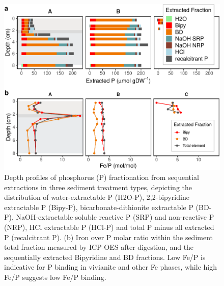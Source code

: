 \documentclass[12pt,twoside]{book}
\begin{document}
\begin{figure}
\centering
\includegraphics{my-thesis_files/figure-latex/IncubationSeq-1.pdf}
\caption{\label{fig:IncubationSeq}Depth profiles of phosphorus (P) fractionation from sequential extractions in three sediment treatment types, depicting the distribution of water-extractable P (H2O-P), 2,2-bipyridine extractable P (Bipy-P), bicarbonate-dithionite extractable P (BD-P), NaOH-extractable soluble reactive P (SRP) and non-reactive P (NRP), HCl extractable P (HCl-P) and total P minus all extracted P (recalcitrant P). (b) Iron over P molar ratio within the sediment total fraction measured by ICP-OES after digestion, and the sequentially extracted Bipyridine and BD fractions. Low Fe/P is indicative for P binding in vivianite and other Fe phases, while high Fe/P suggests low Fe/P binding.}
\end{figure}
\end{document}
